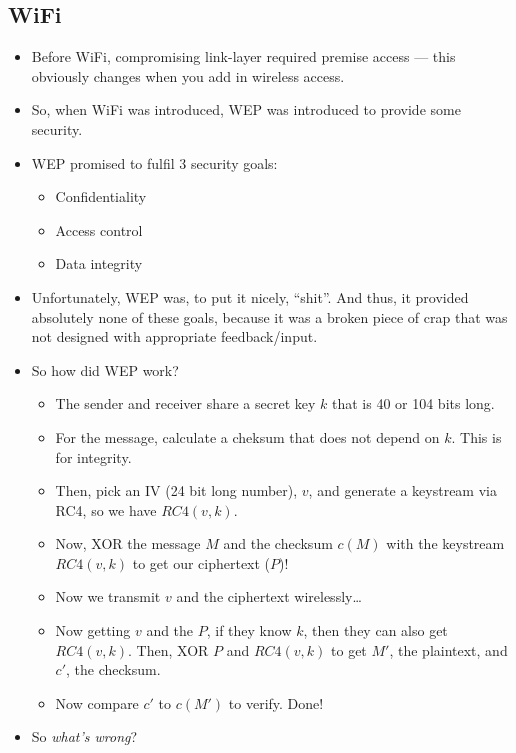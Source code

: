 \documentclass{article}
\begin{document}
\subsection{WiFi}
\begin{itemize}
    \item Before WiFi, compromising link-layer required premise access --- this obviously changes when you add in wireless access.
    \item So, when WiFi was introduced, WEP was introduced to provide some security.
    \item WEP promised to fulfil 3 security goals:
        \begin{itemize}
            \item Confidentiality
            \item Access control
            \item Data integrity
        \end{itemize}
    \item Unfortunately, WEP was, to put it nicely, ``shit''.  And thus, it provided absolutely none of these goals, because it was a broken piece of crap that was not designed with appropriate feedback/input.
    \item So how did WEP work?
        \begin{itemize}
            \item The sender and receiver share a secret key $k$ that is 40 or 104 bits long.
            \item For the message, calculate a cheksum that does not depend on $k$.  This is for integrity.
            \item Then, pick an IV (24 bit long number), $v$, and generate a keystream via RC4, so we have $RC4(v, k)$.
            \item Now, XOR the message $M$ and the checksum $c(M)$ with the keystream $RC4(v, k)$ to get our ciphertext ($P$)!
            \item Now we transmit $v$ and the ciphertext wirelessly\dots
            \item Now getting $v$ and the $P$, if they know $k$, then they can also get $RC4(v, k)$.  Then, XOR $P$ and $RC4(v, k)$ to get $M'$, the plaintext, and $c'$, the checksum.
            \item Now compare $c'$ to $c(M')$ to verify.  Done!
        \end{itemize}
    \item So \emph{what's wrong}?
        \begin{itemize}

\end{itemize}
\end{itemize}
\end{document}
